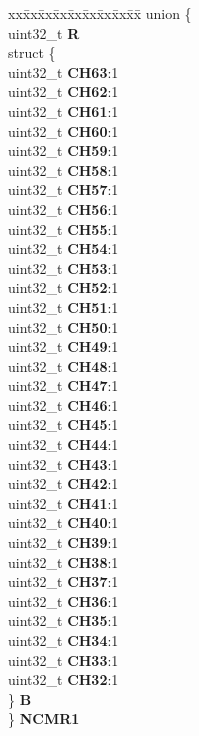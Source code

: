 \begin{DoxyCompactItemize}
\begin{tabbing}
\end{tabbing}\item 
\mbox{\label{structADC__tag_a39421177f93c39d36ce0fdd77dce3780}} 
\begin{tabbing}
xx\=xx\=xx\=xx\=xx\=xx\=xx\=xx\=xx\=\kill
union \{\\
\>uint32\_t {\bfseries R}\\
\>struct \{\\
\>\>uint32\_t {\bfseries CH63}:1\\
\>\>uint32\_t {\bfseries CH62}:1\\
\>\>uint32\_t {\bfseries CH61}:1\\
\>\>uint32\_t {\bfseries CH60}:1\\
\>\>uint32\_t {\bfseries CH59}:1\\
\>\>uint32\_t {\bfseries CH58}:1\\
\>\>uint32\_t {\bfseries CH57}:1\\
\>\>uint32\_t {\bfseries CH56}:1\\
\>\>uint32\_t {\bfseries CH55}:1\\
\>\>uint32\_t {\bfseries CH54}:1\\
\>\>uint32\_t {\bfseries CH53}:1\\
\>\>uint32\_t {\bfseries CH52}:1\\
\>\>uint32\_t {\bfseries CH51}:1\\
\>\>uint32\_t {\bfseries CH50}:1\\
\>\>uint32\_t {\bfseries CH49}:1\\
\>\>uint32\_t {\bfseries CH48}:1\\
\>\>uint32\_t {\bfseries CH47}:1\\
\>\>uint32\_t {\bfseries CH46}:1\\
\>\>uint32\_t {\bfseries CH45}:1\\
\>\>uint32\_t {\bfseries CH44}:1\\
\>\>uint32\_t {\bfseries CH43}:1\\
\>\>uint32\_t {\bfseries CH42}:1\\
\>\>uint32\_t {\bfseries CH41}:1\\
\>\>uint32\_t {\bfseries CH40}:1\\
\>\>uint32\_t {\bfseries CH39}:1\\
\>\>uint32\_t {\bfseries CH38}:1\\
\>\>uint32\_t {\bfseries CH37}:1\\
\>\>uint32\_t {\bfseries CH36}:1\\
\>\>uint32\_t {\bfseries CH35}:1\\
\>\>uint32\_t {\bfseries CH34}:1\\
\>\>uint32\_t {\bfseries CH33}:1\\
\>\>uint32\_t {\bfseries CH32}:1\\
\>\} {\bfseries B}\\
\} {\bfseries NCMR1}\\


\end{tabbing}
\end{DoxyCompactItemize}
